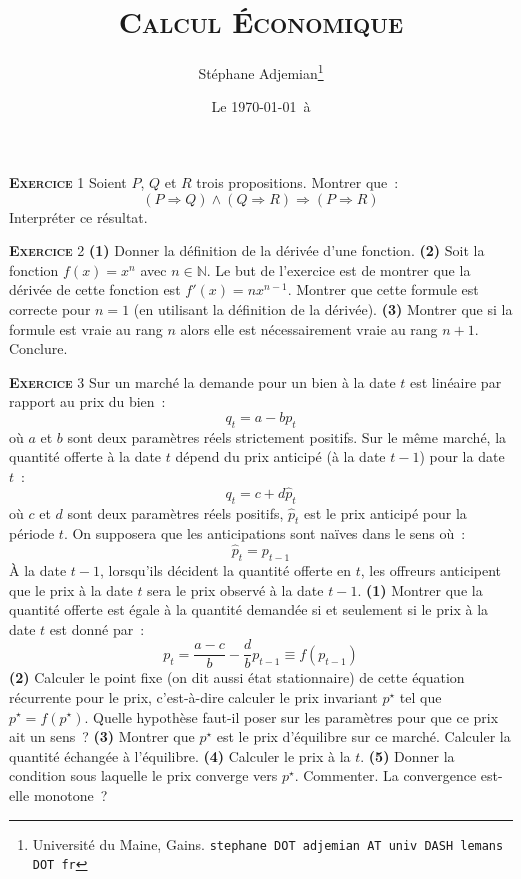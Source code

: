 \documentclass[10pt,a4paper,notitlepage]{article}
\newcommand{\exercice}[1]{\textsc{\textbf{Exercice}} #1}
\begin{document}
\title{\textsc{Calcul Économique}}
\author{Stéphane Adjemian\thanks{Université du Maine, Gains. \texttt{stephane DOT adjemian AT univ DASH lemans DOT fr}}}
\date{Le \today\ à \thistime}

\maketitle

\exercice{1} Soient $P$, $Q$ et $R$ trois propositions. Montrer que :
	\[
		(P \Rightarrow Q) \land (Q \Rightarrow R) \Rightarrow (P \Rightarrow R)
	\]
	Interpréter ce résultat.
	
\bigskip

\exercice{2} \textbf{(1)} Donner la définition de la dérivée d'une
fonction. \textbf{(2)} Soit la fonction $f(x) = x^n$ avec
$n\in\mathbb N$. Le but de l'exercice est de montrer que la dérivée de
cette fonction est $f'(x) = nx^{n-1}$. Montrer que cette formule est
correcte pour $n=1$ (en utilisant la définition de la
dérivée). \textbf{(3)} Montrer que si la formule est vraie au rang $n$
alors elle est nécessairement vraie au rang $n+1$. Conclure.

\bigskip

\exercice{3} Sur un marché la demande pour un bien à la date $t$ est linéaire par
rapport au prix du bien :
\[
q_t = a - b p_t
\]
où $a$ et $b$ sont deux paramètres réels strictement positifs. Sur le même marché,
la quantité offerte à la date $t$ dépend du prix anticipé (à la date
$t-1$) pour la date $t$ :
\[
q_t = c + d \hat p_t
\]
où $c$ et $d$ sont deux paramètres réels positifs, $\hat p_t$ est le
prix anticipé pour la période $t$. On supposera que les anticipations
sont naïves dans le sens où :
\[
\hat p_t = p_{t-1}
\]
À la date $t-1$, lorsqu'ils décident la quantité offerte en $t$, les offreurs anticipent que le prix à la date $t$ sera le prix observé
à la date $t-1$. \textbf{(1)} Montrer que la quantité offerte est
égale à la quantité demandée si et seulement si le prix à la date $t$
est donné par :
\[
p_t = \frac{a-c}{b} - \frac{d}{b} p_{t-1} \equiv f(p_{t-1})
\]
\textbf{(2)} Calculer le point fixe (on dit aussi état stationnaire)
de cette équation récurrente pour le prix, c'est-à-dire calculer le
prix invariant $p^{\star}$ tel que $p^{\star} = f(p^{\star})$. Quelle hypothèse
faut-il poser sur les paramètres pour que ce prix ait un sens ? \textbf{(3)}
Montrer que $p^{\star}$ est le prix d'équilibre sur ce
marché. Calculer la quantité échangée à l'équilibre. \textbf{(4)}
Calculer le prix à la $t$. \textbf{(5)} Donner la condition sous
laquelle le prix converge vers $p^{\star}$. Commenter. La convergence
est-elle monotone ?
\end{document}

